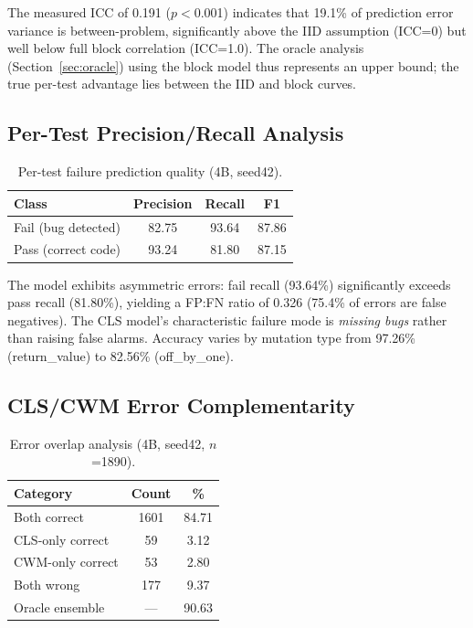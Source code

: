 \documentclass[11pt,a4paper]{article}
\begin{document}
The measured ICC of 0.191 ($p<$0.001) indicates that 19.1\% of prediction error variance is between-problem, significantly above the IID assumption (ICC=0) but well below full block correlation (ICC=1.0). The oracle analysis (Section~\ref{sec:oracle}) using the block model thus represents an upper bound; the true per-test advantage lies between the IID and block curves.

\subsection{Per-Test Precision/Recall Analysis}
\label{sec:precision}

\begin{table}[h]
\centering
\caption{Per-test failure prediction quality (4B, seed42).}
\label{tab:prec}
\begin{tabular}{lccc}
\toprule
Class & Precision & Recall & F1 \\
\midrule
Fail (bug detected) & 82.75 & 93.64 & 87.86 \\
Pass (correct code) & 93.24 & 81.80 & 87.15 \\
\bottomrule
\end{tabular}
\end{table}

The model exhibits asymmetric errors: fail recall (93.64\%) significantly exceeds pass recall (81.80\%), yielding a FP:FN ratio of 0.326 (75.4\% of errors are false negatives). The CLS model's characteristic failure mode is \emph{missing bugs} rather than raising false alarms. Accuracy varies by mutation type from 97.26\% (return\_value) to 82.56\% (off\_by\_one).

\subsection{CLS/CWM Error Complementarity}
\label{sec:complement}

\begin{table}[h]
\centering
\caption{Error overlap analysis (4B, seed42, $n$=1890).}
\label{tab:overlap}
\begin{tabular}{lcc}
\toprule
Category & Count & \% \\
\midrule
Both correct & 1601 & 84.71 \\
CLS-only correct & 59 & 3.12 \\
CWM-only correct & 53 & 2.80 \\
Both wrong & 177 & 9.37 \\
\midrule
Oracle ensemble & --- & 90.63 \\
\bottomrule
\end{tabular}
\end{table}
\end{document}
